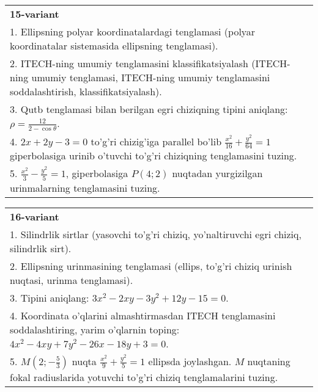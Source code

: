 \documentclass{article}
\begin{document}
\begin{tabular}{m{17cm}}
\textbf{15-variant}\\
1. Ellipsning polyar koordinatalardagi tenglamasi (polyar koordinatalar sistemasida ellipsning tenglamasi).\\

2. ITECH-ning umumiy tenglamasini klassifikatsiyalash (ITECH-ning umumiy tenglamasi, ITECH-ning umumiy tenglamasini soddalashtirish, klassifikatsiyalash).\\

3. Qutb tenglamasi bilan berilgan egri chiziqning tipini aniqlang: $\rho=\frac{12}{2-\cos\theta}$.\\

4. $2x + 2y - 3 = 0$ to'g'ri chizig'iga parallel bo'lib $\frac{x^{2}}{16} + \frac{y^{2}}{64} = 1$ giperbolasiga urinib o'tuvchi to'g'ri chiziqning tenglamasini tuzing.  \\

5. $\frac{x^{2}}{3} - \frac{y^{2}}{5} = 1$, giperbolasiga $P(4;2)$ nuqtadan yurgizilgan urinmalarning tenglamasini tuzing.  
\end{tabular}
\vspace{1cm}


\begin{tabular}{m{17cm}}
\textbf{16-variant}\\
1. Silindrlik sirtlar (yasovchi to'g'ri chiziq, yo'naltiruvchi egri chiziq, silindrlik sirt).\\

2. Ellipsning urinmasining tenglamasi (ellips, to'g'ri chiziq urinish nuqtasi, urinma tenglamasi).\\

3. Tipini aniqlang: $3x^{2}-2xy-3y^{2}+12y-15=0$.\\

4. Koordinata o'qlarini almashtirmasdan ITECH tenglamasini soddalashtiring, yarim o'qlarnin toping: $4x^{2} - 4xy + 7y^{2} - 26x - 18y + 3 = 0$.\\

5. $M(2; - \frac{5}{3})$ nuqta $\frac{x^{2}}{9} + \frac{y^{2}}{5} = 1$ ellipsda joylashgan. $M$ nuqtaning fokal radiuslarida yotuvchi to'g'ri chiziq tenglamalarini tuzing.  
\end{tabular}
\vspace{1cm}
\end{document}
